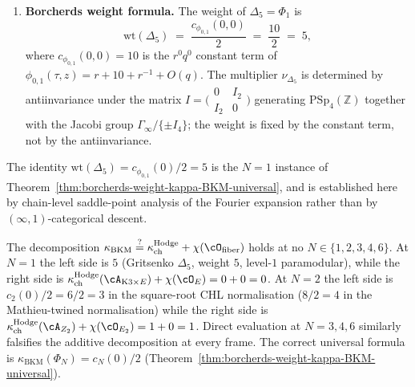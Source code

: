 \begin{lemma}[Saddle-point asymptotics and Hecke-trick normalisation for \texorpdfstring{$\Phi_1 = \Delta_5$}{Phi-1 = Delta-5}]
\begin{enumerate}
rescaling.
\item \textbf{Borcherds weight formula.} The weight of $\Delta_5 = \Phi_1$
is
\[
 \mathrm{wt}(\Delta_5) \;=\; \frac{c_{\phi_{0,1}}(0, 0)}{2}
 \;=\; \frac{10}{2} \;=\; 5,
\]
where $c_{\phi_{0,1}}(0, 0) = 10$ is the $r^0 q^0$ constant term of
$\phi_{0,1}(\tau, z) = r + 10 + r^{-1} + O(q)$. The multiplier
$\nu_{\Delta_5}$ is determined by antiinvariance under the matrix
$I = \bigl(\begin{smallmatrix}0 & I_2 \\ I_2 & 0\end{smallmatrix}\bigr)$
generating $\mathrm{PSp}_4(\mathbb{Z})$ together with the Jacobi
group $\Gamma_\infty/\{\pm I_4\}$; the weight is fixed by the constant
term, not by the antiinvariance.
\end{enumerate}
The identity $\mathrm{wt}(\Delta_5) = c_{\phi_{0,1}}(0)/2 = 5$ is the
$N = 1$ instance of
Theorem~\ref{thm:borcherds-weight-kappa-BKM-universal}, and is
established here by chain-level saddle-point analysis of the Fourier
expansion rather than by $(\infty, 1)$-categorical descent.
\end{lemma}

\begin{remark}
\label{rem:bkm-additive-decomposition-fails}
The decomposition
$\kappa_{\mathrm{BKM}} \stackrel{?}{=} \kappa_{\mathrm{ch}}^{\mathrm{Hodge}} + \chi(\cO_{\mathrm{fiber}})$
holds at no $N \in \{1, 2, 3, 4, 6\}$. At $N = 1$ the left side is $5$
(Gritsenko $\Delta_5$, weight $5$, level-$1$ paramodular), while the
right side is $\kappa_{\mathrm{ch}}^{\mathrm{Hodge}}(\cA_{\mathrm{K3}\times E}) + \chi(\cO_E) = 0 + 0 = 0$.
At $N = 2$ the left side is $c_2(0)/2 = 6/2 = 3$ in the square-root
CHL normalisation ($8/2 = 4$ in the Mathieu-twined normalisation)
while the right side is
$\kappa_{\mathrm{ch}}^{\mathrm{Hodge}}(\cA_{Z_2}) + \chi(\cO_{E_2}) = 1 + 0 = 1$.
Direct evaluation at $N = 3, 4, 6$ similarly falsifies the additive
decomposition at every frame. The correct universal formula is
$\kappa_{\mathrm{BKM}}(\Phi_N) = c_N(0)/2$
(Theorem~\ref{thm:borcherds-weight-kappa-BKM-universal}).
\end{remark}

